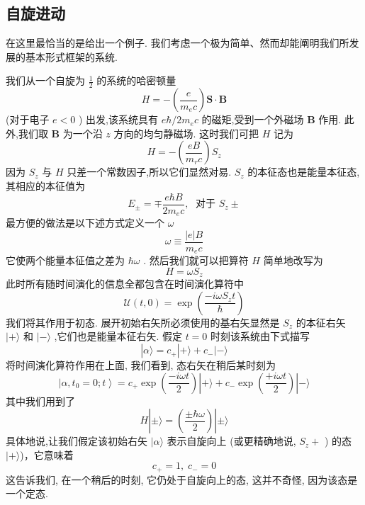 \subsection{自旋进动}
在这里最恰当的是给出一个例子. 我们考虑一个极为简单、然而却能阐明我们所发展的基本形式框架的系统.

我们从一个自旋为 $\frac{1}{2}$ 的系统的哈密顿量
\begin{equation}
	H = - \left( \frac{e}{{m}_{e}c}\right) \mathbf{S} \cdot \mathbf{B}
\end{equation}
(对于电子 $e < 0$ ) 出发,该系统具有 $e\hbar /2{m}_{e}c$ 的磁矩,受到一个外磁场 $\mathbf{B}$ 作用. 此外,我们取 $\mathbf{B}$ 为一个沿 $z$ 方向的均匀静磁场. 这时我们可把 $H$ 记为
\begin{equation}
	H = - \left( \frac{eB}{{m}_{r}c}\right) {S}_{z}
\end{equation}
因为 ${S}_{z}$ 与 $H$ 只差一个常数因子,所以它们显然对易. ${S}_{z}$ 的本征态也是能量本征态,其相应的本征值为
\begin{equation}
	{E}_{ \pm } = \mp \frac{e\hbar B}{2{m}_{e}c},\;\text{ 对于 }{S}_{z} \pm
\end{equation}
最方便的做法是以下述方式定义一个 $\omega$
\begin{equation}
	\omega \equiv \frac{\left| e\right| B}{{m}_{e}c}
\end{equation}
它使两个能量本征值之差为 $\hbar \omega$ . 然后我们就可以把算符 $H$ 简单地改写为
\begin{equation}
	H = \omega {S}_{z}
\end{equation}
此时所有随时间演化的信息全都包含在时间演化算符中
\begin{equation}
	\mathcal{U}\left( {t,0}\right) = \exp \left( \frac{-{i\omega }{S}_{z}t}{\hbar }\right)
\end{equation}
我们将其作用于初态. 展开初始右矢所必须使用的基右矢显然是 ${S}_{z}$ 的本征右矢 $| + \rangle$ 和 $| - \rangle$ ,它们也是能量本征右矢. 假定 $t = 0$ 时刻该系统由下式描写
\begin{equation}
	\left| {\alpha \rangle = {c}_{ + }}\right| + \rangle + {c}_{ - }| - \rangle
\end{equation}
将时间演化算符作用在上面, 我们看到, 态右矢在稍后某时刻为
\begin{equation}
	\left| {\alpha ,{t}_{0} = 0;t}\right\rangle = {c}_{ + }\exp \left( \frac{-{i\omega t}}{2}\right) | {+\rangle + {c}_{ - }\exp \left( \frac{+{i\omega t}}{2}\right) }| - \rangle
\end{equation}
其中我们用到了
\begin{equation}
	H| {\pm \rangle = \left( \frac{\pm \hbar \omega }{2}\right) }| \pm \rangle
\end{equation}
具体地说,让我们假定该初始右矢 $|\alpha \rangle$ 表示自旋向上 (或更精确地说, ${S}_{z} +$ ) 的态$|+\rangle$)，它意味着
\begin{equation}
	{c}_{ + } = 1,\;{c}_{ - } = 0
\end{equation}
这告诉我们, 在一个稍后的时刻, 它仍处于自旋向上的态, 这并不奇怪, 因为该态是一个定态.

